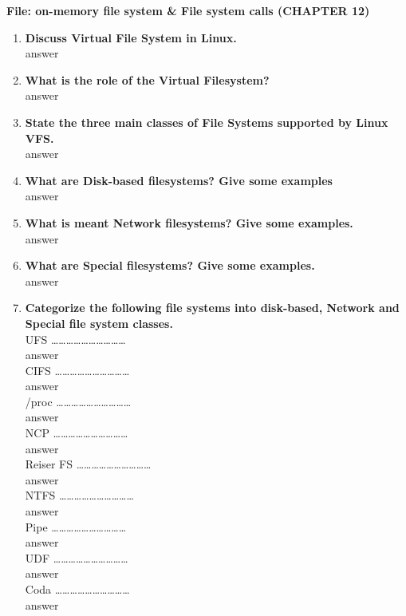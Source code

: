 \documentclass[a4paper,12pt]{article}
\begin{document}
\begin{flushleft}
\textbf{File: on-memory file system \& File system calls
(CHAPTER 12)}
\begin{enumerate}
\item \textbf{  Discuss Virtual File System in Linux.}\\
{\color{red}answer}\\
\item \textbf{  What is the role of the Virtual Filesystem?}\\
{\color{red}answer}\\
\item \textbf{  State the three main classes of File Systems supported by Linux VFS.}\\
{\color{red}answer}\\
\item \textbf{  What are Disk-based filesystems? Give some examples}\\
{\color{red}answer}\\
\item \textbf{  What is meant Network filesystems? Give some examples.}\\
{\color{red}answer}\\
\item \textbf{  What are Special filesystems? Give some examples.}\\
{\color{red}answer}\\
\item \textbf{  Categorize the following file systems into disk-based, Network and Special file system classes.}\\
UFS …………………………\\{\color{red}answer}\\
CIFS …………………………\\{\color{red}answer}\\
/proc …………………………\\{\color{red}answer}\\
NCP …………………………\\{\color{red}answer}\\
Reiser FS …………………………\\{\color{red}answer}\\
NTFS …………………………\\{\color{red}answer}\\
Pipe …………………………\\{\color{red}answer}\\
UDF …………………………\\{\color{red}answer}\\
Coda …………………………\\{\color{red}answer}\\

\end{enumerate}
\end{flushleft}
\end{document}
